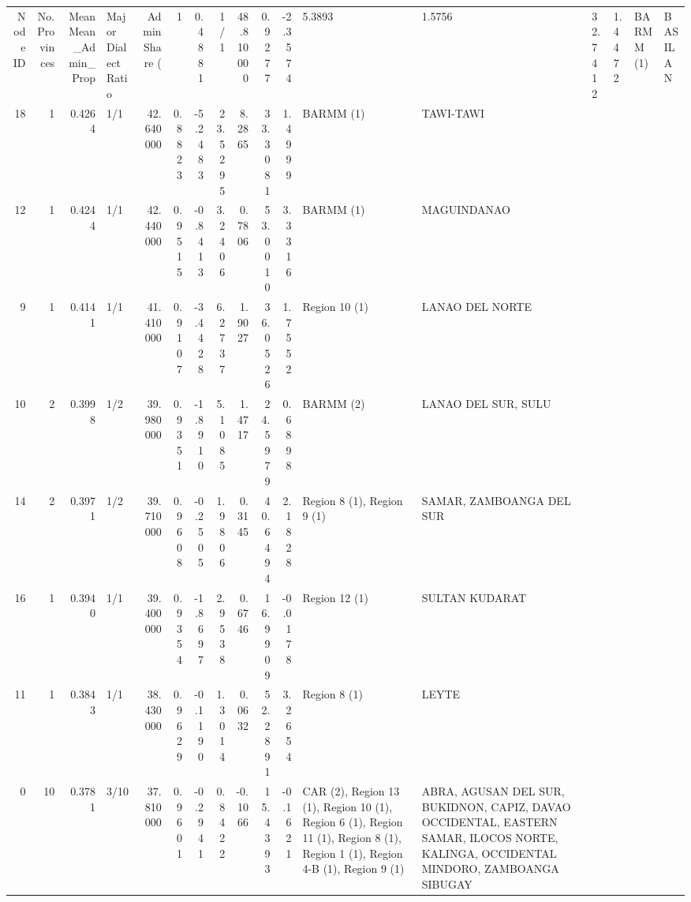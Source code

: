 \begin{tabular}{rrrlrrrrrrrll}
\toprule
Node ID & No. Provinces & Mean Mean_Admin_Prop & Major Dialect Ratio & Admin Share (%
 & 1 & {} \color[HTML]{F1F1F1} 0.4881 & 1/1 & {} \color[HTML]{F1F1F1} 48.810000 & 0.9277 & -2.3574 & 5.3893 & 1.5756 & 32.7412 & 1.4472 & BARMM (1) & BASILAN \\
18 & 1 & {} \color[HTML]{000000} 0.4264 & 1/1 & {} \color[HTML]{000000} 42.640000 & 0.8823 & -5.2483 & 23.5295 & 8.2865 & 33.3081 & 1.4999 & BARMM (1) & TAWI-TAWI \\
12 & 1 & {} \color[HTML]{000000} 0.4244 & 1/1 & {} \color[HTML]{000000} 42.440000 & 0.9515 & -0.8413 & 3.2406 & 0.7806 & 53.0010 & 3.3316 & BARMM (1) & MAGUINDANAO \\
9 & 1 & {} \color[HTML]{000000} 0.4141 & 1/1 & {} \color[HTML]{000000} 41.410000 & 0.9107 & -3.4428 & 6.2737 & 1.9027 & 36.0526 & 1.7552 & Region 10 (1) & LANAO DEL NORTE \\
10 & 2 & {} \color[HTML]{000000} 0.3998 & 1/2 & {} \color[HTML]{000000} 39.980000 & 0.9351 & -1.8910 & 5.1085 & 1.4717 & 24.5979 & 0.6898 & BARMM (2) & LANAO DEL SUR, SULU \\
14 & 2 & {} \color[HTML]{000000} 0.3971 & 1/2 & {} \color[HTML]{000000} 39.710000 & 0.9608 & -0.2505 & 1.9806 & 0.3145 & 40.6494 & 2.1828 & Region 8 (1), Region 9 (1) & SAMAR, ZAMBOANGA DEL SUR \\
16 & 1 & {} \color[HTML]{000000} 0.3940 & 1/1 & {} \color[HTML]{000000} 39.400000 & 0.9354 & -1.8697 & 2.9538 & 0.6746 & 16.9909 & -0.0178 & Region 12 (1) & SULTAN KUDARAT \\
11 & 1 & {} \color[HTML]{000000} 0.3843 & 1/1 & {} \color[HTML]{000000} 38.430000 & 0.9629 & -0.1190 & 1.3014 & 0.0632 & 52.2891 & 3.2654 & Region 8 (1) & LEYTE \\
0 & 10 & {} \color[HTML]{000000} 0.3781 & 3/10 & {} \color[HTML]{000000} 37.810000 & 0.9601 & -0.2941 & 0.8422 & -0.1066 & 15.4393 & -0.1621 & CAR (2), Region 13 (1), Region 10 (1), Region 6 (1), Region 11 (1), Region 8 (1), Region 1 (1), Region 4-B (1), Region 9 (1) & ABRA, AGUSAN DEL SUR, BUKIDNON, CAPIZ, DAVAO OCCIDENTAL, EASTERN SAMAR, ILOCOS NORTE, KALINGA, OCCIDENTAL MINDORO, ZAMBOANGA SIBUGAY \\

\end{tabular}
